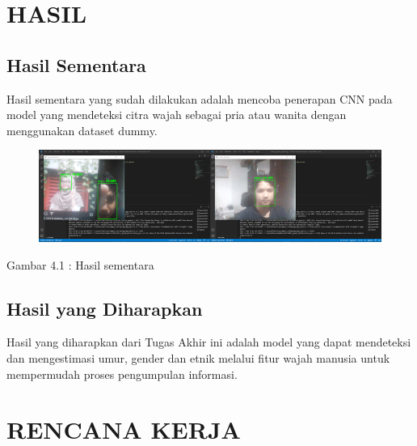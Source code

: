\section{HASIL}

\subsection{Hasil Sementara}
Hasil sementara yang sudah dilakukan adalah mencoba penerapan CNN pada model yang mendeteksi citra wajah
sebagai pria atau wanita dengan menggunakan dataset dummy.
\begin{figure} [H] \centering
  \includegraphics[scale=0.8]{gambar/HasilSementara.png}
  \label{fig:HasilSementara}
\end{figure}

\begin{center}
  Gambar 4.1 : Hasil sementara
\end{center}

\subsection{Hasil yang Diharapkan}
Hasil yang diharapkan dari Tugas Akhir ini adalah model yang dapat mendeteksi dan mengestimasi umur, 
gender dan etnik melalui fitur wajah manusia untuk mempermudah proses pengumpulan informasi.



\section{RENCANA KERJA}

